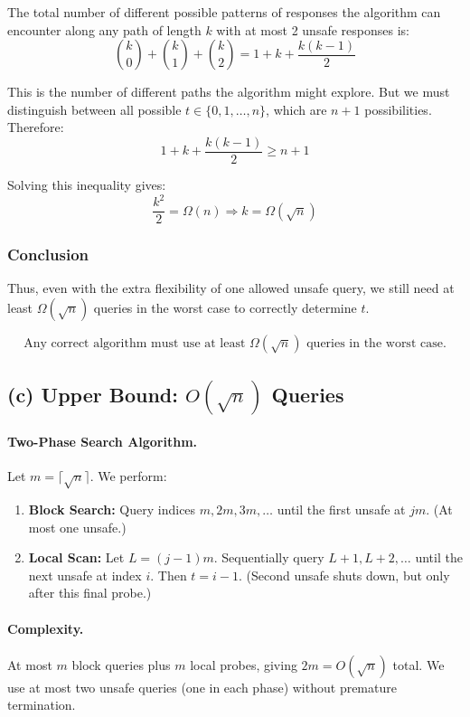 \documentclass[12pt]{article}
\begin{document}
	The total number of different possible patterns of responses the algorithm can encounter along any path of length $k$ with at most 2 unsafe responses is:
	\[
	\binom{k}{0} + \binom{k}{1} + \binom{k}{2} = 1 + k + \frac{k(k - 1)}{2}
	\]
	
	This is the number of different paths the algorithm might explore. But we must distinguish between all possible $t \in \{0, 1, \dots, n\}$, which are $n+1$ possibilities. Therefore:
	\[
	1 + k + \frac{k(k - 1)}{2} \geq n + 1
	\]
	
	Solving this inequality gives:
	\[
	\frac{k^2}{2} = \Omega(n) \Rightarrow k = \Omega(\sqrt{n})
	\]
	
	\subsubsection*{Conclusion}
	Thus, even with the extra flexibility of one allowed unsafe query, we still need at least $\Omega(\sqrt{n})$ queries in the worst case to correctly determine $t$.
	
	\[
	\boxed{
		\text{Any correct algorithm must use at least } \Omega(\sqrt{n}) \text{ queries in the worst case.}
	}
	\]
	
	
	\subsection*{(c) Upper Bound: $O(\sqrt{n})$ Queries}
	
	\paragraph{Two-Phase Search Algorithm.}
	Let $m = \lceil\sqrt{n}\rceil$. We perform:
	\begin{enumerate}
		\item \textbf{Block Search:} Query indices $m,2m,3m,\dots$ until the first unsafe at $jm$. (At most one unsafe.)
		\item \textbf{Local Scan:} Let $L=(j-1)m$. Sequentially query $L+1, L+2,\dots$ until the next unsafe at index $i$. Then $t=i-1$. (Second unsafe shuts down, but only after this final probe.)
	\end{enumerate}
	
	\paragraph{Complexity.}
	At most $m$ block queries plus $m$ local probes, giving $2m=O(\sqrt{n})$ total. We use at most two unsafe queries (one in each phase) without premature termination.
	
\end{document}
